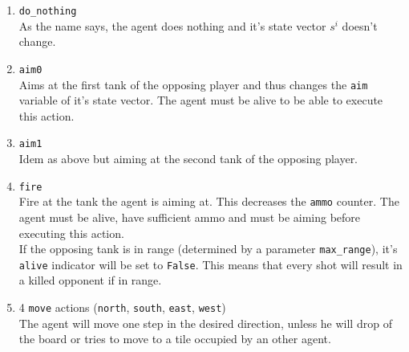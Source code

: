 \begin{enumerate}
    \item {\tt do\_nothing}\\
        As the name says, the agent does nothing and it's state vector $s^i$ doesn't change.
    \item {\tt aim0} \\
        Aims at the first tank of the opposing player and thus changes the {\tt aim} variable of it's state vector. The agent must be alive to be able to execute this action.
    \item {\tt aim1} \\
        Idem as above but aiming at the second tank of the opposing player.
    \item {\tt fire} \\
        Fire at the tank the agent is aiming at. This decreases the {\tt ammo} counter. The agent must be alive, have sufficient ammo and must be aiming before executing this action.\\
        If the opposing tank is in range (determined by a parameter {\tt max\_range}), it's {\tt alive} indicator will be set to {\tt False}. This means that every shot will result in a killed opponent if in range.
    \item 4 {\tt move} actions ({\tt north}, {\tt south}, {\tt east}, {\tt west})\\
        The agent will move one step in the desired direction, unless he will drop of the board or tries to move to a tile occupied by an other agent.
\end{enumerate}

